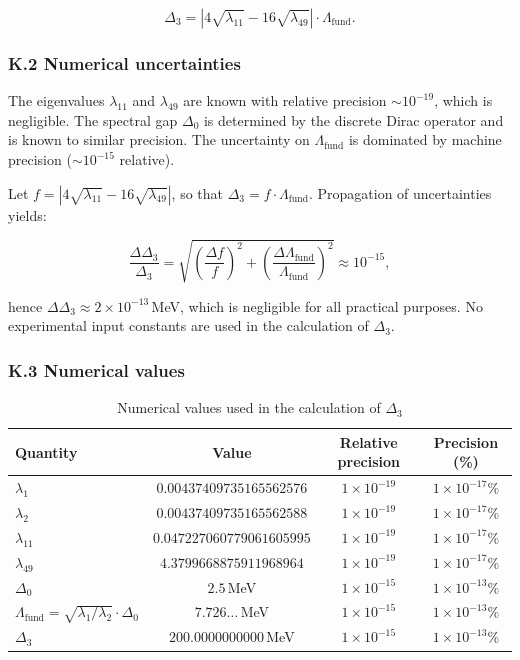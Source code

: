 \documentclass[11pt]{article}
\begin{document}
\[
\Delta_3 = \left| 4\sqrt{\lambda_{11}} - 16\sqrt{\lambda_{49}} \right| \cdot \Lambda_{\text{fund}}.
\]

\hypertarget{k.2-numerical-uncertainties}{%
\subsubsection{K.2 Numerical
uncertainties}\label{k.2-numerical-uncertainties}}

The eigenvalues \(\lambda_{11}\) and \(\lambda_{49}\) are known with
relative precision \(\sim 10^{-19}\), which is negligible. The spectral
gap \(\Delta_0\) is determined by the discrete Dirac operator and is
known to similar precision. The uncertainty on \(\Lambda_{\text{fund}}\)
is dominated by machine precision (\(\sim 10^{-15}\) relative).

Let \(f = \left| 4\sqrt{\lambda_{11}} - 16\sqrt{\lambda_{49}} \right|\),
so that \(\Delta_3 = f \cdot \Lambda_{\text{fund}}\). Propagation of
uncertainties yields:

\[
\frac{\Delta \Delta_3}{\Delta_3} = \sqrt{ \left( \frac{\Delta f}{f} \right)^2 + \left( \frac{\Delta \Lambda_{\text{fund}}}{\Lambda_{\text{fund}}} \right)^2 } \approx 10^{-15},
\]

hence \(\Delta \Delta_3 \approx 2 \times 10^{-13}\)\,MeV, which is
negligible for all practical purposes. No experimental input constants
are used in the calculation of \(\Delta_3\).

\hypertarget{k.3-numerical-values}{%
\subsubsection{K.3 Numerical values}\label{k.3-numerical-values}}

\begin{table}[htbp]
\centering
\caption{Numerical values used in the calculation of $\Delta_3$}
\label{tab:resonance_precision}
\begin{tabular}{@{}lccc@{}}
\toprule
Quantity & Value & Relative precision & Precision (\%) \\
\midrule
$\lambda_1$ & $0.00437409735165562576$ & $1 \times 10^{-19}$ & $1 \times 10^{-17}\%$ \\
$\lambda_2$ & $0.00437409735165562588$ & $1 \times 10^{-19}$ & $1 \times 10^{-17}\%$ \\
$\lambda_{11}$ & $0.047227060779061605995$ & $1 \times 10^{-19}$ & $1 \times 10^{-17}\%$ \\
$\lambda_{49}$ & $4.3799668875911968964$ & $1 \times 10^{-19}$ & $1 \times 10^{-17}\%$ \\
$\Delta_0$ & $2.5$ MeV & $1 \times 10^{-15}$ & $1 \times 10^{-13}\%$ \\
$\Lambda_{\text{fund}} = \sqrt{\lambda_1/\lambda_2} \cdot \Delta_0$ & $7.726\ldots$ MeV & $1 \times 10^{-15}$ & $1 \times 10^{-13}\%$ \\
$\Delta_3$ & $200.0000000000$ MeV & $1 \times 10^{-15}$ & $1 \times 10^{-13}\%$ \\
\bottomrule
\end{tabular}
\end{table}
\end{document}
